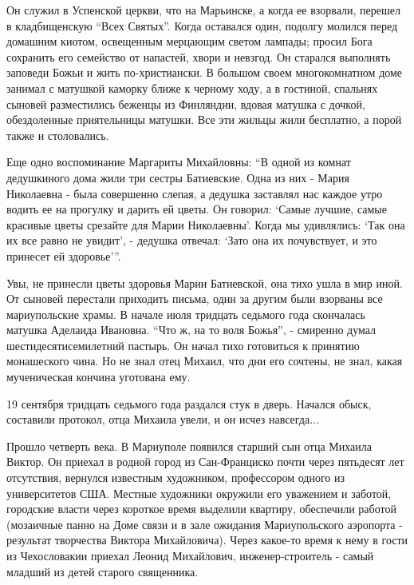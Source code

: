 
Он служил в Успенской церкви, что на Марьинске, а когда ее взорвали, перешел в
кладбищенскую \enquote{Всех Святых}. Когда оставался один, подолгу молился перед
домашним киотом, освещенным мерцающим светом лампады; просил Бога сохранить
его семейство от напастей, хвори и невзгод. Он старался выполнять заповеди
Божьи и жить по-христиански. В большом своем многокомнатном доме занимал с
матушкой каморку ближе к черному ходу, а в гостиной, спальнях сыновей
разместились беженцы из Финляндии, вдовая матушка с дочкой, обездоленные
приятельницы матушки. Все эти жильцы жили бесплатно, а порой также и
столовались.

Еще одно воспоминание Маргариты Михайловны: \enquote{В одной из комнат дедушкиного
дома жили три сестры Батиевские. Одна из них - Мария Николаевна - была
совершенно слепая, а дедушка заставлял нас каждое утро водить ее на прогулку и
дарить ей цветы. Он говорил: \enquote{Самые лучшие, самые красивые цветы срезайте для
Марии Николаевны}. Когда мы удивлялись: \enquote{Так она их все равно не увидит}, -
дедушка отвечал: \enquote{Зато она их почувствует, и это принесет ей здоровье}}.

Увы, не принесли цветы здоровья Марии Батиевской, она тихо ушла в мир иной. От
сыновей перестали приходить письма, один за другим были взорваны все
мариупольские храмы. В начале июля тридцать седьмого года скончалась матушка
Аделаида Ивановна. \enquote{Что ж, на то воля Божья}, - смиренно думал
шестидесятисемилетний пастырь. Он начал тихо готовиться к принятию монашеского
чина. Но не знал отец Михаил, что дни его сочтены, не знал, какая мученическая
кончина уготована ему.

19 сентября тридцать седьмого года раздался стук в дверь. Начался обыск,
составили протокол, отца Михаила увели, и он исчез навсегда...


Прошло четверть века. В Мариуполе появился старший сын отца Михаила Виктор. Он
приехал в родной город из Сан-Франциско почти через пятьдесят лет отсутствия,
вернулся известным художником, профессором одного из университетов США.
Местные художники окружили его уважением и заботой, городские власти через
короткое время выделили квартиру, обеспечили работой (мозаичные панно на Доме
связи и в зале ожидания Мариупольского аэропорта - результат творчества
Виктора Михайловича). Через какое-то время к нему в гости из Чехословакии
приехал Леонид Михайлович, инженер-строитель - самый младший из детей старого
священника.

